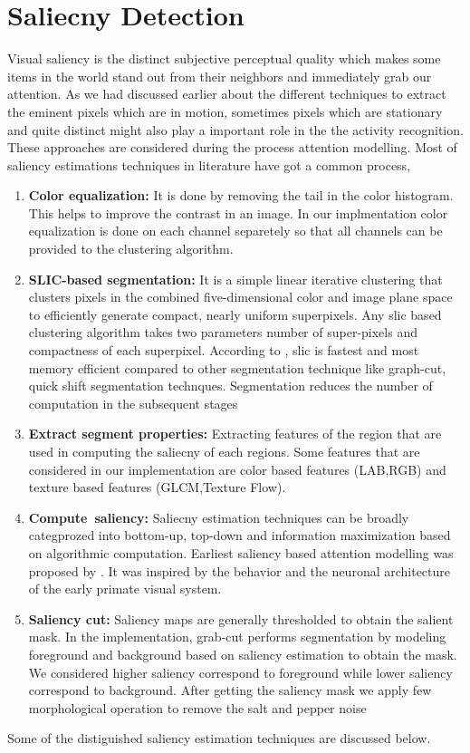\section{Saliecny Detection}
Visual saliency is the distinct subjective perceptual quality which makes some items in the world stand out from their neighbors and immediately grab our attention.
As we had discussed earlier about the different techniques to extract the eminent pixels which are in motion, sometimes pixels which are stationary and quite distinct might also play a important role in the the activity recognition. These approaches are considered during the process attention modelling. Most of saliency estimations techniques in literature have got a common process,
\begin{enumerate}
	\item{\textbf{Color equalization:} It is done by removing the tail in the color histogram. This helps to improve the contrast in an image. In our implmentation color equalization is done on each channel separetely so that all channels can be provided to the clustering algorithm.}
	\item{\textbf{SLIC-based segmentation:}  It is a simple linear iterative clustering that clusters pixels in the combined five-dimensional color and image plane space to efficiently generate compact, nearly uniform superpixels. Any slic based clustering algorithm takes two parameters number of super-pixels and compactness of each superpixel. According to \cite{slic}, slic is fastest and most memory efficient compared to  other segmentation technique like graph-cut, quick shift segmentation technques. Segmentation reduces the number of computation in the subsequent stages}
	\item{\textbf{Extract segment properties:} Extracting features of the region that are used in computing the saliecny of each regions. Some features that are considered in our implementation are color based features (LAB,RGB) and texture based features (GLCM,Texture Flow).}
	\item{\textbf{Compute~saliency:} Saliecny estimation techniques can be broadly categprozed into bottom-up, top-down and information maximization based on algorithmic computation. Earliest saliency based attention modelling was proposed by \cite{itti}. It was inspired by the behavior and the neuronal architecture of the early primate visual system.}
	\item{\textbf{Saliency cut:} Saliency maps are generally thresholded to obtain the salient mask. In the implementation, grab-cut\citep{grabcut} performs segmentation by modeling foreground and background based on saliency estimation to obtain the mask. We considered higher saliency  correspond to foreground while lower saliency correspond to background. After getting the saliency mask we apply few morphological operation to remove the salt and pepper noise}
\end{enumerate} 
\par Some of the distiguished saliency estimation techniques are discussed below. 
